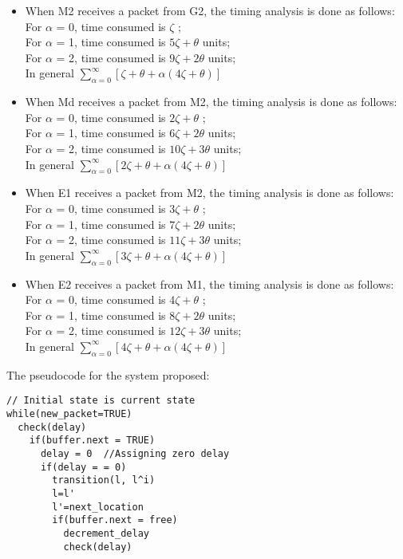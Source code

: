 \documentclass[letterpaper]{article}
\begin{document}
\begin{itemize}
\item When M2 receives a packet from G2, the timing analysis is done as follows:
\\ For $\alpha$ = 0, time consumed is $\zeta$ ;
\\For $\alpha$ = 1, time consumed is $5\zeta+\theta$ units;
\\For $\alpha$ = 2, time consumed is $9\zeta+2\theta$ units;
\\ In general $\displaystyle\sum\limits_{\alpha=0}^{\infty} [\zeta+\theta+\alpha(4\zeta+\theta)]$ 

\item When Md receives a packet from M2, the timing analysis is done as follows:
\\ For $\alpha$ = 0, time consumed is $2\zeta+\theta$ ;
\\For $\alpha$ = 1, time consumed is $6\zeta+2\theta$ units;
\\For $\alpha$ = 2, time consumed is $10\zeta+3\theta$ units;
\\ In general $\displaystyle\sum\limits_{\alpha=0}^{\infty} [2\zeta+\theta+\alpha(4\zeta+\theta)]$ 

\item When E1 receives a packet from M2, the timing analysis is done as follows:
\\ For $\alpha$ = 0, time consumed is $3\zeta+\theta$ ;
\\For $\alpha$ = 1, time consumed is $7\zeta+2\theta$ units;
\\For $\alpha$ = 2, time consumed is $11\zeta+3\theta$ units;
\\ In general $\displaystyle\sum\limits_{\alpha=0}^{\infty} [3\zeta+\theta+\alpha(4\zeta+\theta)]$ 
\item When E2 receives a packet from M1, the timing analysis is done as follows:
\\ For $\alpha$ = 0, time consumed is $4\zeta+\theta$ ;
\\For $\alpha$ = 1, time consumed is $8\zeta+2\theta$ units;
\\For $\alpha$ = 2, time consumed is $12\zeta+3\theta$ units;
\\ In general $\displaystyle\sum\limits_{\alpha=0}^{\infty} [4\zeta+\theta+\alpha(4\zeta+\theta)]$
\end{itemize}

The pseudocode for the system proposed:

\begin{verbatim} 
// Initial state is current state
while(new_packet=TRUE)
  check(delay) 
    if(buffer.next = TRUE)
      delay = 0  //Assigning zero delay
      if(delay = = 0)
        transition(l, l^i)
        l=l'
        l'=next_location
        if(buffer.next = free)
          decrement_delay
          check(delay) 
          
\end{verbatim}
\end{document}
